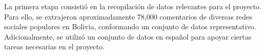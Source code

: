La primera etapa consistió en la recopilación de datos relevantes para el proyecto. Para ello, se extrajeron aproximadamente 78,000 comentarios de diversas redes sociales populares en Bolivia, conformando un conjunto de datos representativo. Adicionalmente, se utilizó un conjunto de datos en español para apoyar ciertas tareas necesarias en el proyecto.
